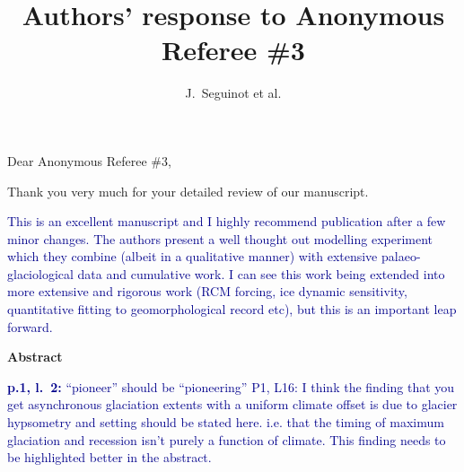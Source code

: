 

\title{Authors' response to Anonymous Referee \#3}
\author{J.~Seguinot et al.}


\maketitle
\bigskip


\newcommand{\sechead}[1]{\bigskip\noindent\textbf{#1}}
\newcommand{\referee}[1]{\bigskip\noindent\textcolor{darkblue}{#1}}
\newcommand{\msquote}[1]{\begin{quote}\textit{#1}\end{quote}}
\newcommand{\doi}[1]{doi:\allowbreak\href{http://dx.doi.org/#1}{#1}}

Dear Anonymous Referee \#3,

Thank you very much for your detailed review of our manuscript.

    \referee{%
        This is an excellent manuscript and I highly recommend publication
        after a few minor changes. The authors present a well thought out
        modelling experiment which they combine (albeit in a qualitative
        manner) with extensive palaeo-glaciological data and cumulative work. I
        can see this work being extended into more extensive and rigorous work
        (RCM forcing, ice dynamic sensitivity, quantitative fitting to
        geomorphological record etc), but this is an important leap forward.}


\sechead{Abstract}

    \referee{\textbf{p.1, l.~2:}
        ``pioneer'' should be ``pioneering'' P1, L16: I think the finding that
        you get asynchronous glaciation extents with a uniform climate offset
        is due to glacier hypsometry and setting should be stated here. i.e.
        that the timing of maximum glaciation and recession isn't purely a
        function of climate. This finding needs to be highlighted better in the
        abstract.}


